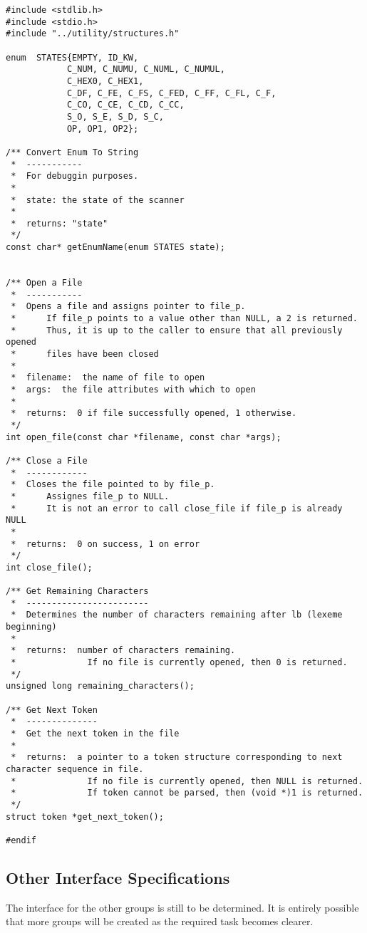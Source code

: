 \documentclass{article}
\begin{document}
\begin{lstlisting}
#include <stdlib.h>
#include <stdio.h>
#include "../utility/structures.h"

enum  STATES{EMPTY, ID_KW, 
            C_NUM, C_NUMU, C_NUML, C_NUMUL, 
            C_HEX0, C_HEX1, 
            C_DF, C_FE, C_FS, C_FED, C_FF, C_FL, C_F,
            C_CO, C_CE, C_CD, C_CC,
            S_O, S_E, S_D, S_C,
            OP, OP1, OP2};

/** Convert Enum To String
 *  -----------
 *  For debuggin purposes.
 *
 *  state: the state of the scanner
 *
 *  returns: "state" 
 */
const char* getEnumName(enum STATES state);


/** Open a File
 *  -----------
 *  Opens a file and assigns pointer to file_p.
 *      If file_p points to a value other than NULL, a 2 is returned.
 *      Thus, it is up to the caller to ensure that all previously opened
 *      files have been closed
 *
 *  filename:  the name of file to open
 *  args:  the file attributes with which to open
 *
 *  returns:  0 if file successfully opened, 1 otherwise.
 */
int open_file(const char *filename, const char *args);

/** Close a File
 *  ------------
 *  Closes the file pointed to by file_p.
 *      Assignes file_p to NULL.
 *      It is not an error to call close_file if file_p is already NULL
 *
 *  returns:  0 on success, 1 on error
 */
int close_file();

/** Get Remaining Characters
 *  ------------------------
 *  Determines the number of characters remaining after lb (lexeme beginning)
 *
 *  returns:  number of characters remaining.
 *              If no file is currently opened, then 0 is returned.
 */
unsigned long remaining_characters();

/** Get Next Token
 *  --------------
 *  Get the next token in the file
 *
 *  returns:  a pointer to a token structure corresponding to next character sequence in file.
 *              If no file is currently opened, then NULL is returned.
 *              If token cannot be parsed, then (void *)1 is returned.
 */
struct token *get_next_token();

#endif
\end{lstlisting}

\subsection{Other Interface Specifications}
The interface for the other groups is still to be determined.  It is entirely possible that more groups will be created as the required task becomes clearer.
\end{document}
